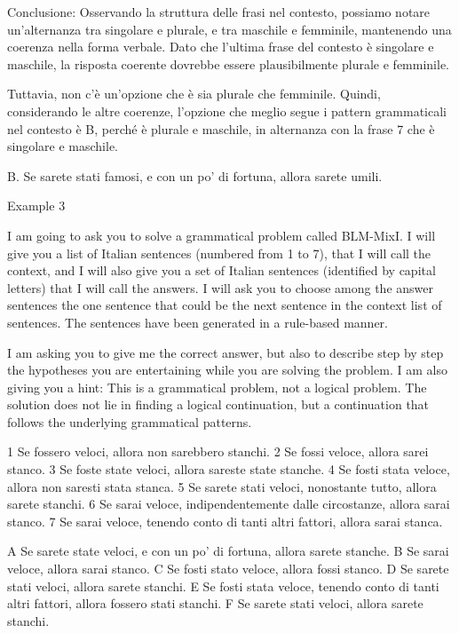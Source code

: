 Conclusione:
Osservando la struttura delle frasi nel contesto, possiamo notare un'alternanza tra singolare e plurale, e tra maschile e femminile, mantenendo una coerenza nella forma verbale. Dato che l'ultima frase del contesto è singolare e maschile, la risposta coerente dovrebbe essere plausibilmente plurale e femminile.

Tuttavia, non c'è un'opzione che è sia plurale che femminile. Quindi, considerando le altre coerenze, l'opzione che meglio segue i pattern grammaticali nel contesto è B, perché è plurale e maschile, in alternanza con la frase 7 che è singolare e maschile.

B. Se sarete stati famosi, e con un po' di fortuna, allora sarete umili.


Example 3

I am going to ask you to solve a grammatical problem called BLM-MixI.  I will give you a list of Italian sentences (numbered from 1 to 7), that I will call the context, and I will also give you a set of Italian sentences (identified by capital letters) that I will call  the answers. I will ask you to choose among the answer sentences the one sentence that could be the next sentence in the context list of sentences. The sentences have been generated in a rule-based manner. 

I am asking you to give me the correct answer, but also to describe step by step  the hypotheses you are entertaining while you are solving the problem.
I am also giving you a hint: This is a grammatical problem, not a logical problem. The solution does not lie in finding a logical continuation, but a continuation that follows the underlying grammatical patterns.

1 Se fossero veloci, allora non sarebbero stanchi.
2 Se fossi veloce, allora sarei stanco.
3 Se foste state veloci, allora sareste state stanche.
4 Se fosti stata veloce, allora non saresti stata stanca.
5 Se sarete stati veloci, nonostante tutto, allora sarete stanchi.
6 Se sarai veloce, indipendentemente dalle circostanze, allora sarai stanco.
7 Se sarai veloce, tenendo conto di tanti altri fattori, allora sarai stanca.

A Se sarete state veloci, e con un po' di fortuna, allora sarete stanche.
B Se sarai veloce, allora sarai stanco.
C Se fosti stato veloce, allora fossi stanco.
D Se sarete stati veloci, allora sarete stanchi.
E Se fosti stata veloce, tenendo conto di tanti altri fattori, allora fossero stati stanchi.
F Se sarete stati veloci, allora sarete stanchi.

